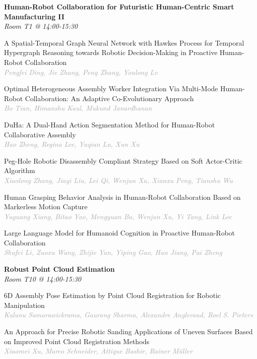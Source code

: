 \begin{multicols*}{2}
\normalsize \textbf{Human-Robot Collaboration for Futuristic Human-Centric Smart Manufacturing II}\\
\small \textit{Room T1 @ 14:00-15:30}

\small A Spatial-Temporal Graph Neural Network with Hawkes Process for Temporal Hypergraph Reasoning towards Robotic Decision-Making in Proactive Human-Robot Collaboration\\ 
\footnotesize \textcolor{darkgray}{\textit{Pengfei Ding, Jie  Zhang, Peng  Zhang, Youlong  Lv}}

\small Optimal Heterogeneous Assembly Worker Integration Via Multi-Mode Human-Robot Collaboration: An Adaptive Co-Evolutionary Approach\\ 
\footnotesize \textcolor{darkgray}{\textit{Bo Tian, Himanshu  Kaul, Mukund  Janardhanan}}

\small DuHa: A Dual-Hand Action Segmentation Method for Human-Robot Collaborative Assembly\\ 
\footnotesize \textcolor{darkgray}{\textit{Hao Zheng, Regina  Lee, Yuqian  Lu, Xun  Xu}}

\small Peg-Hole Robotic Disassembly Compliant Strategy Based on Soft Actor-Critic Algorithm\\ 
\footnotesize \textcolor{darkgray}{\textit{Xiaolong Zhang, Jiayi  Liu, Lei  Qi, Wenjun  Xu, Xianxu  Peng, Tianshu  Wu}}

\small Human Grasping Behavior Analysis in Human-Robot Collaboration Based on Markerless Motion Capture\\ 
\footnotesize \textcolor{darkgray}{\textit{Yuguang Xiang, Bitao  Yao, Mengyuan  Ba, Wenjun  Xu, Yi  Tang, Link  Lee}}

\small Large Language Model for Humanoid Cognition in Proactive Human-Robot Collaboration\\ 
\footnotesize \textcolor{darkgray}{\textit{Shufei Li, Zuoxu  Wang, Zhijie  Yan, Yiping  Gao, Han  Jiang, Pai  Zheng}}

\normalsize \textbf{Robust Point Cloud Estimation}\\
\small \textit{Room T10 @ 14:00-15:30}

\small 6D Assembly Pose Estimation by Point Cloud Registration for Robotic Manipulation\\ 
\footnotesize \textcolor{darkgray}{\textit{Kulunu Samarawickrama, Gaurang  Sharma, Alexandre  Angleraud, Roel S.  Pieters}}

\small An Approach for Precise Robotic Sanding Applications of Uneven Surfaces Based on Improved Point Cloud Registration Methods\\ 
\footnotesize \textcolor{darkgray}{\textit{Xiaomei Xu, Marco  Schneider, Attique  Bashir, Rainer  Müller}}


\end{multicols*}
